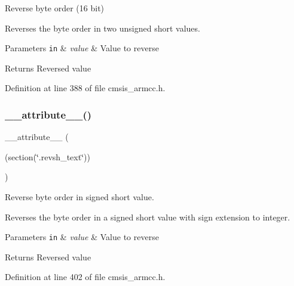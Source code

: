 Reverse byte order (16 bit) 

Reverses the byte order in two unsigned short values. 
\begin{DoxyParams}[1]{Parameters}
\mbox{\tt in}  & {\em value} & Value to reverse \\
\hline
\end{DoxyParams}
\begin{DoxyReturn}{Returns}
Reversed value 
\end{DoxyReturn}


Definition at line 388 of file cmsis\+\_\+armcc.\+h.

\mbox{\label{group___c_m_s_i_s___core___instruction_interface_ga8e7a866927d3257a82b884ad14dbef4c}} 
\subsubsection{\texorpdfstring{\+\_\+\+\_\+attribute\+\_\+\+\_\+()}{\_\_attribute\_\_()}\hspace{0.1cm}{\footnotesize\ttfamily [2/3]}}
{\footnotesize\ttfamily \+\_\+\+\_\+attribute\+\_\+\+\_\+ (\begin{DoxyParamCaption}\item[{(section(\char`\"{}.revsh\+\_\+text\char`\"{}))}]{ }\end{DoxyParamCaption})}



Reverse byte order in signed short value. 

Reverses the byte order in a signed short value with sign extension to integer. 
\begin{DoxyParams}[1]{Parameters}
\mbox{\tt in}  & {\em value} & Value to reverse \\
\hline
\end{DoxyParams}
\begin{DoxyReturn}{Returns}
Reversed value 
\end{DoxyReturn}


Definition at line 402 of file cmsis\+\_\+armcc.\+h.

\mbox{\label{group___c_m_s_i_s___core___instruction_interface_gade0870dc150fccdf0a5ae2d3300b2954}} 

